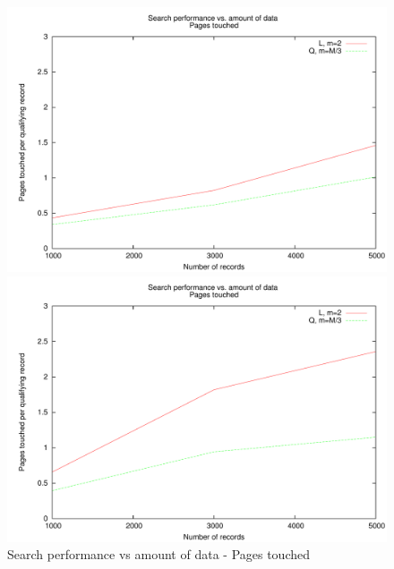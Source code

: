 \begin{figure}
\centering
\begin{minipage}{0.49\textwidth}
\centering
\includegraphics[width=\textwidth]{fig/random/figure-4-8.pdf}
\end{minipage}
\begin{minipage}{0.49\textwidth}
\centering
\includegraphics[width=\textwidth]{fig/usppp/figure-4-8.pdf}
\end{minipage}
\caption{Search performance vs amount of data - Pages touched}
\label{fig:4.8}
\end{figure}


